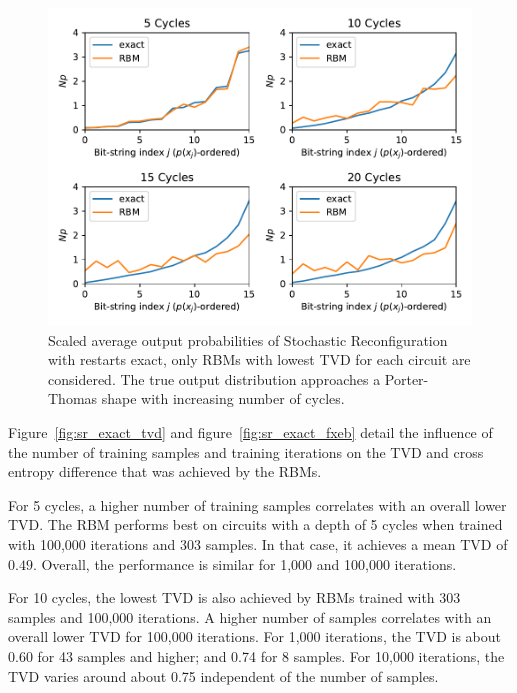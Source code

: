 \begin{figure}[H]
  \centering
  \includegraphics[width=\textwidth]{figures/results/SR-restarts-not-learned/avgBestPDF.pdf}
  \caption[Averaged best performing scaled output probabilities of Stochastic Reconfiguration with restarts exact]{
    Scaled average output probabilities of Stochastic Reconfiguration with restarts exact, only RBMs with lowest
    TVD for each circuit are considered. The true 
    output distribution approaches a Porter-Thomas shape with increasing number of cycles.}
  \label{fig:sr_exact_bestPDF}
\end{figure}

Figure~\ref{fig:sr_exact_tvd} and figure~\ref{fig:sr_exact_fxeb} detail the influence of the 
number of training samples and training iterations on the TVD and cross entropy difference that was achieved by 
the RBMs. 

For 5 cycles, a higher number of training samples 
correlates with an overall lower TVD. The RBM performs best on 
circuits with a depth of 5 cycles when trained with 100,000 iterations and 303 samples. In that case, 
it achieves a mean TVD of $0.49$. Overall, the performance is similar for 1,000 and 100,000 iterations.

For 10 cycles, the lowest TVD is also achieved by RBMs trained with 303 samples and 100,000 iterations.
A higher number of samples correlates with an overall lower TVD for 100,000 iterations. For 1,000 iterations, 
the TVD is about 0.60 for 43 samples and higher; and 0.74 for 8 samples. For 10,000 iterations, the TVD varies 
around about 0.75 independent of the number of samples. 

